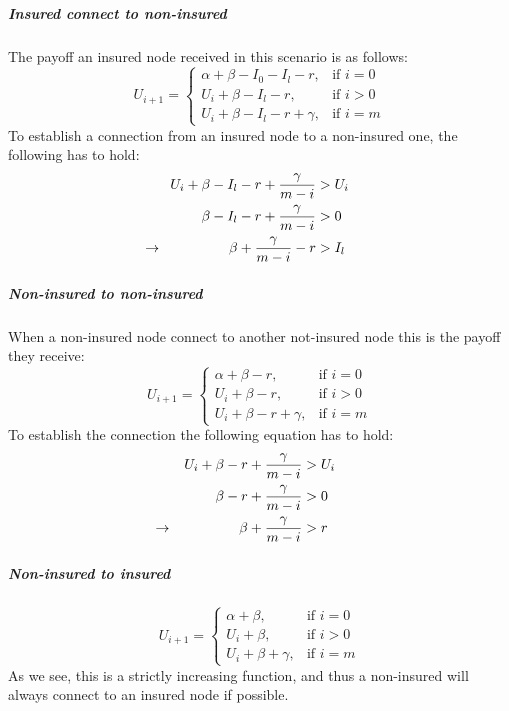 \subparagraph{Insured connect to non-insured}
The payoff an insured node received in this scenario is as follows:
\begin{equation}
    U_{i+1}= 
\begin{cases}
    \alpha + \beta - I_{0} - I_{l} -r,& \text{if } i = 0\\
    U_{i}+\beta -I_{l}-r,& \text{if }  i>0\\
    U_{i}+\beta -I_{l}-r+\gamma,& \text{if } i=m
\end{cases}
\label{eq:itonoti}
\end{equation}
To establish a connection from an insured node to a non-insured one, the following has to hold:
\begin{eqnarray}
U_{i}+\beta-I_{l}-r+\frac{\gamma}{m-i}&>U_{i} \nonumber \\ 
\beta-I_{l}-r+\frac{\gamma}{m-i}&>0 \nonumber \\ 
\llap{$\rightarrow$\hspace{50pt}} \beta+\frac{\gamma}{m-i}-r&>I_{l} 
\end{eqnarray}
\subparagraph{Non-insured to non-insured}
When a non-insured node connect to another not-insured node this is the payoff they receive:
\begin{equation}
    U_{i+1}= 
\begin{cases}
    \alpha + \beta -r,& \text{if } i = 0\\
    U_{i}+\beta -r,& \text{if }  i>0\\
    U_{i}+\beta -r +\gamma,& \text{if } i=m
\end{cases}
\label{eq:noitonoti}
\end{equation}
To establish the connection the following equation has to hold:
\begin{eqnarray}
U_{i}+\beta-r+\frac{\gamma}{m-i}&>U_{i} \nonumber \\ 
\beta-r+\frac{\gamma}{m-i}&>0 \nonumber \\ 
\llap{$\rightarrow$\hspace{50pt}} \beta+\frac{\gamma}{m-i}&>r
\end{eqnarray}
\subparagraph{Non-insured to insured}
\begin{equation}
    U_{i+1}= 
\begin{cases}
    \alpha + \beta,& \text{if } i = 0\\
    U_{i}+\beta,& \text{if }  i>0\\
    U_{i}+\beta +\gamma,& \text{if } i=m
\end{cases}
\label{eq:noitoti}
\end{equation}
As we see, this is a strictly increasing function, and thus a non-insured will always connect to an insured node if possible.
